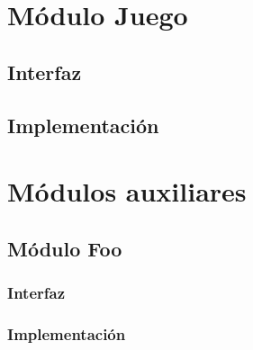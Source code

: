 \section{Módulo Juego}
\subsection{Interfaz}
\subsection{Implementación}
\newpage

\section{Módulos auxiliares}
\subsection{Módulo Foo}
\subsubsection{Interfaz}
\subsubsection{Implementación}




